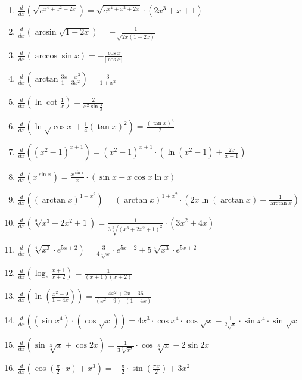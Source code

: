 \documentclass[11pt,a4paper]{article}
\begin{document}
\begin{enumerate}
\item $\displaystyle \frac{d}{dx}\left( \sqrt{e^{x^{4} + x^{2} + 2x}} \right) = \sqrt{e^{x^{4} + x^{2} + 2x}} \cdot (2x^{3} + x + 1)$
\item $\displaystyle \frac{d}{dx}\left( \arcsin\sqrt{1 - 2x} \right) = -\frac{1}{\sqrt{2x(1 - 2x)}}$
\item $\displaystyle \frac{d}{dx}\left( \arccos\sin x \right) = -\frac{\cos x}{|\cos x|}$
\item $\displaystyle \frac{d}{dx}\left( \arctan\frac{3x - x^{3}}{1 - 3x^{2}} \right) = \frac{3}{1 + x^{2}}$
\item $\displaystyle \frac{d}{dx}\left( \ln\cot\frac{1}{x} \right) = \frac{2}{x^{2}\sin\frac{2}{x}}$
\item $\displaystyle \frac{d}{dx}\left( \ln\sqrt{\cos x} + \frac{1}{4}(\tan x)^{2} \right) = \frac{(\tan x)^{3}}{2}$
\item $\displaystyle \frac{d}{dx}\left( (x^{2} - 1)^{x + 1} \right) = (x^{2} - 1)^{x + 1} \cdot \left(\ln(x^{2} - 1) + \frac{2x}{x - 1}\right)$
\item $\displaystyle \frac{d}{dx}\left( x^{\sin x} \right) = \frac{x^{\sin x}}{x} \cdot (\sin x + x\cos x\ln x)$
\item $\displaystyle \frac{d}{dx}\left( (\arctan x)^{1 + x^{2}} \right) = (\arctan x)^{1 + x^{2}} \cdot \left(2x\ln(\arctan x) + \frac{1}{\arctan x}\right)$
\item $\displaystyle \frac{d}{dx}\left( \sqrt[3]{x^{3} + 2x^{2} + 1} \right) = \frac{1}{3\sqrt[3]{(x^{3} + 2x^{2} + 1)^{2}}} \cdot (3x^{2} + 4x)$
\item $\displaystyle \frac{d}{dx}\left( \sqrt[4]{x^{3}} \cdot e^{5x + 2} \right) = \frac{3}{4\sqrt[4]{x}} \cdot e^{5x + 2} + 5\sqrt[4]{x^{3}} \cdot e^{5x + 2}$
\item $\displaystyle \frac{d}{dx}\left( \log_{e}\frac{x + 1}{x + 2} \right) = \frac{1}{(x + 1)(x + 2)}$
\item $\displaystyle \frac{d}{dx}\left( \ln\left(\frac{x^{2} - 9}{1 - 4x}\right) \right) = \frac{-4x^{2} + 2x - 36}{(x^{2} - 9) \cdot (1 - 4x)}$
\item $\displaystyle \frac{d}{dx}\left( (\sin x^{4}) \cdot (\cos\sqrt{x}) \right) = 4x^{3} \cdot \cos x^{4} \cdot \cos\sqrt{x} - \frac{1}{2\sqrt{x}} \cdot \sin x^{4} \cdot \sin\sqrt{x}$
\item $\displaystyle \frac{d}{dx}\left( \sin\sqrt[3]{x} + \cos 2x \right) = \frac{1}{3\sqrt[3]{x^{2}}} \cdot \cos\sqrt[3]{x} - 2\sin 2x$
\item $\displaystyle \frac{d}{dx}\left( \cos\left(\frac{\pi}{2} \cdot x\right) + x^{3} \right) = -\frac{\pi}{2} \cdot \sin\left(\frac{\pi x}{2}\right) + 3x^{2}$

\end{enumerate}
\end{document}
